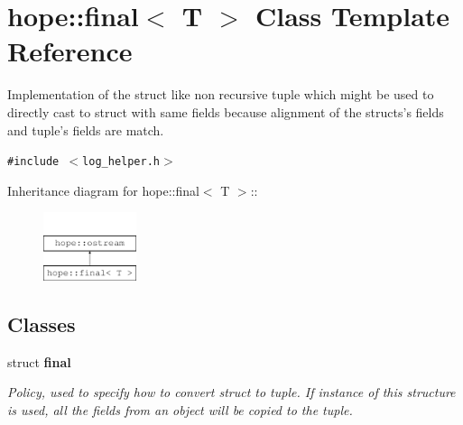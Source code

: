 \hypertarget{classhope_1_1final}{
\section{hope::final$<$ T $>$ Class Template Reference}
\label{classhope_1_1final}
}
Implementation of the struct like non recursive tuple which might be used to directly cast to struct with same fields because alignment of the structs's fields and tuple's fields are match.  


{\tt \#include $<$log\_\-helper.h$>$}

Inheritance diagram for hope::final$<$ T $>$::\begin{figure}[H]
\begin{center}
\leavevmode
\includegraphics[height=2cm]{classhope_1_1final}
\end{center}
\end{figure}
\subsection*{Classes}
\begin{CompactItemize}
\item 
struct \textbf{final}
\begin{CompactList}\small\item\em Policy, used to specify how to convert struct to tuple. If instance of this structure is used, all the fields from an object will be copied to the tuple. \item\end{CompactList}\end{CompactItemize}
